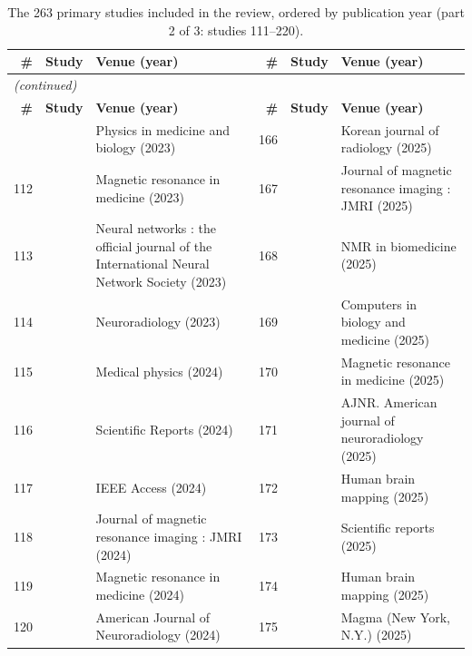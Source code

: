 \documentclass[11pt]{article}
\begin{document}
{\def\baselinestretch{1}\scriptsize
\setlength{\tabcolsep}{3pt}
\renewcommand{\arraystretch}{1.06}
\begin{longtable}{r l p{} r l p{}}
\caption{The 263 primary studies included in the review, ordered by publication year (part 2 of 3: studies 111--220).}\label{tab:supp_included_2}\\
\hline
\textbf{\#} & \textbf{Study} & \textbf{Venue (year)} & \textbf{\#} & \textbf{Study} & \textbf{Venue (year)} \\
\hline
\endfirsthead
\multicolumn{6}{l}{\footnotesize\emph{(continued)}}\\
\hline
\textbf{\#} & \textbf{Study} & \textbf{Venue (year)} & \textbf{\#} & \textbf{Study} & \textbf{Venue (year)} \\
\hline
\endhead
\hline
\endfoot
111 & \cite{zhou2023mitigating} & Physics in medicine and biology (2023) & 166 & \cite{yoo2025evaluation} & Korean journal of radiology (2025) \\
112 & \cite{lau2023pushing} & Magnetic resonance in medicine (2023) & 167 & \cite{tang2025incorporating} & Journal of magnetic resonance imaging : JMRI (2025) \\
113 & \cite{ernst2023sinogram} & Neural networks : the official journal of the International Neural Network Society (2023) & 168 & \cite{nimje2025insights} & NMR in biomedicine (2025) \\
114 & \cite{matsuo2023feasibility} & Neuroradiology (2023) & 169 & \cite{mercier2025intersectionbased} & Computers in biology and medicine (2025) \\
115 & \cite{beljaards2024aibased} & Medical physics (2024) & 170 & \cite{singh2025learningbased} & Magnetic resonance in medicine (2025) \\
116 & \cite{i2024accelerated} & Scientific Reports (2024) & 171 & \cite{raymond2025leveraging} & AJNR. American journal of neuroradiology (2025) \\
117 & \cite{zhou2024adversarial} & IEEE Access (2024) & 172 & \cite{taymourtash2025measuring} & Human brain mapping (2025) \\
118 & \cite{dolui2024automated} & Journal of magnetic resonance imaging : JMRI (2024) & 173 & \cite{karuna2025modified} & Scientific reports (2025) \\
119 & \cite{heo2024cest} & Magnetic resonance in medicine (2024) & 174 & \cite{goffi2025multimetric} & Human brain mapping (2025) \\
120 & \cite{lang2024ultrafast} & American Journal of Neuroradiology (2024) & 175 & \cite{byanju2025myelin} & Magma (New York, N.Y.) (2025) \\

\end{longtable}}
\end{document}
